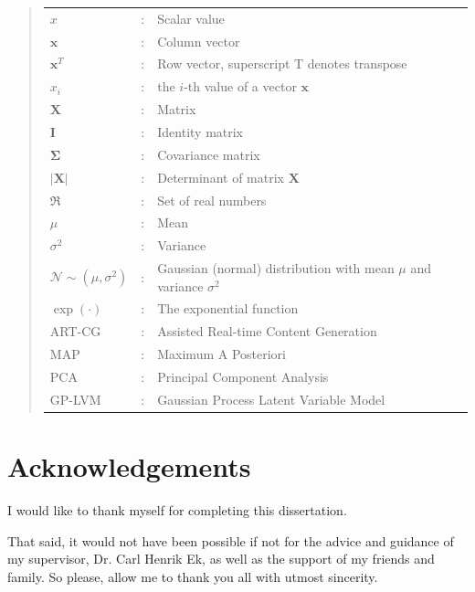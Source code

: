 \documentclass[ %
author={Dillon Keith Diep},
supervisor={Dr. Carl Henrik Ek},
degree={MEng},
title={ART-CG Hair:},
subtitle={Assisted Real-time Content Generation of Stylised Virtual Hair},
type={Research},
year={2017} ]{dissertation}
\begin{document}
\begin{quote}
	\noindent
	\begin{tabular}{lcl}
		$x$                 &:	& Scalar value\\
		$\bm{x}$            &:	& Column vector\\
		$\bm{x}^T$			&:	& Row vector, superscript T denotes transpose\\
		$x_i$               &:  & the $i$-th value of a vector $\bm{x}$\\
		$\bm{X}$			&:	& Matrix\\
		$\bm{I}$ 			&:	& Identity matrix\\
		$\bm{\Sigma}$			&:	& Covariance matrix\\
		$|\bm{X}|$			&:	& Determinant of matrix $\bm{X}$\\
		$\Re$				&:	& Set of real numbers\\
		$\mu$				&:	& Mean\\
		$\sigma^2$			&:	& Variance\\
		$\mathcal{N}\sim(\mu, \sigma^2)$ 			&:	& Gaussian (normal) distribution with mean $\mu$ and variance $\sigma^2$\\
		$\exp(\bm{\cdot})$	&:	& The exponential function\\
		ART-CG				&:	& Assisted Real-time Content Generation\\
		MAP					&:	& Maximum A Posteriori\\
		PCA		 			&:	& Principal Component Analysis\\
		GP-LVM	 			&:	& Gaussian Process Latent Variable Model\\
	\end{tabular}
\end{quote}


\chapter*{Acknowledgements}

I would like to thank myself for completing this dissertation. 

\noindent
That said, it would not have been possible if not for the advice and guidance of my supervisor, Dr. Carl Henrik Ek, as well as the support of my friends and family. So please, allow me to thank you all with utmost sincerity.

\end{document}
